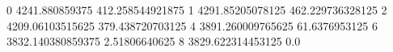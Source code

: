 0 4241.880859375 412.258544921875
1 4291.85205078125 462.229736328125
2 4209.06103515625 379.438720703125
4 3891.260009765625 61.6376953125
6 3832.140380859375 2.51806640625
8 3829.622314453125 0.0
